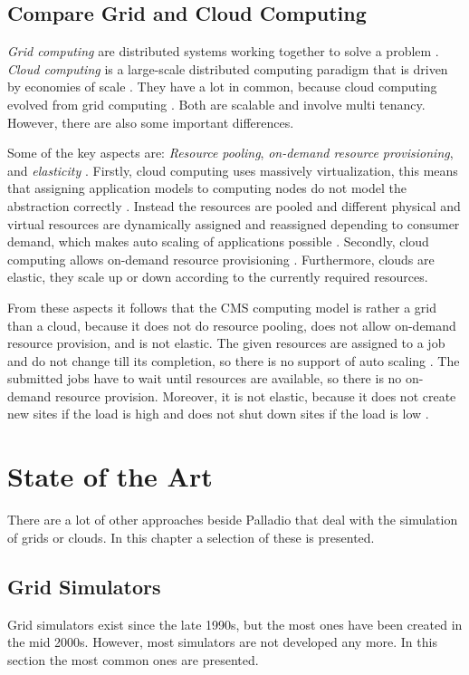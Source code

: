 \section{Compare Grid and Cloud Computing}
\label{grid_cloud}
\textit{Grid computing} are distributed systems working together to solve a problem \cite{mollamotalebi2013grid}.
\textit{Cloud computing} is a large-scale distributed computing paradigm that is driven by economies of scale \cite{foster2008cloud}.
They have a lot in common, because cloud computing evolved from grid computing \cite{foster2008cloud}. Both are scalable and involve multi tenancy.
However, there are also some important differences.

Some of the key aspects are: \textit{Resource pooling}, \textit{on-demand resource provisioning}, and \textit{elasticity} \cite{foster2008cloud}.
Firstly, cloud computing uses massively virtualization, this means that assigning application models to computing nodes do not model the abstraction correctly \cite{cloud_sim}. Instead the resources are pooled and different physical and virtual resources are dynamically assigned and reassigned depending to consumer demand, which makes auto scaling of applications possible \cite{foster2008cloud}.
Secondly, cloud computing allows on-demand resource provisioning \cite{foster2008cloud}. Furthermore, clouds are elastic, they scale up or down according to the currently required resources.

From these aspects it follows that the CMS computing model is rather a grid than a cloud, because it does not do resource pooling, does not allow on-demand resource provision, and is not elastic.
The given resources are assigned to a job and do not change till its completion, so there is no support of auto scaling \cite{wlcg_update}. The submitted jobs have to wait until resources are available, so there is no on-demand resource provision. Moreover, it is not elastic, because it does not create new sites if the load is high and does not shut down sites if the load is low \cite{wlcg_update}.


\chapter{State of the Art}
\label{state}
There are a lot of other approaches beside Palladio that deal with the simulation of grids or clouds.
In this chapter a selection of these is presented.


\section{Grid Simulators}
Grid simulators exist since the late 1990s, but the most ones have been created in the mid 2000s. However, most simulators are not developed any more. In this section the most common ones are presented.

